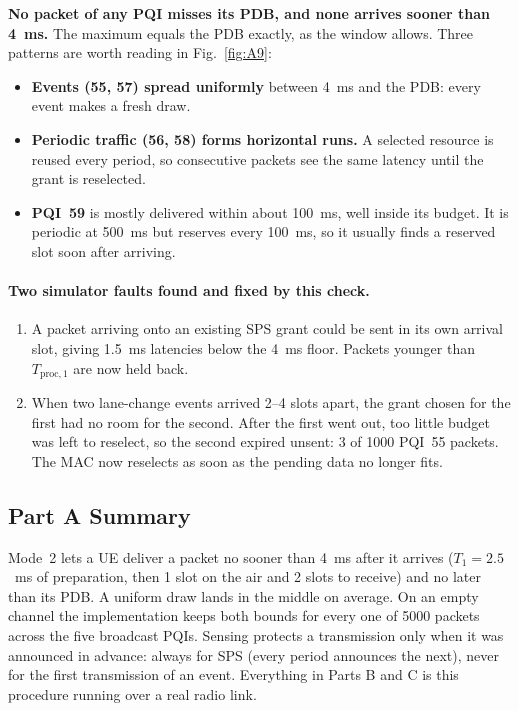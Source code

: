 \documentclass{article}
\newcommand{\Tone}{T_1}
\newcommand{\Tproc}{T_{\mathrm{proc},1}}
\begin{document}
\textbf{No packet of any PQI misses its PDB, and none arrives sooner than
4~ms.} The maximum equals the PDB exactly, as the window allows. Three
patterns are worth reading in Fig.~\ref{fig:A9}:
\begin{itemize}[nosep]
  \item \textbf{Events (55, 57) spread uniformly} between 4~ms and the
  PDB: every event makes a fresh draw.
  \item \textbf{Periodic traffic (56, 58) forms horizontal runs.} A
  selected resource is reused every period, so consecutive packets see
  the same latency until the grant is reselected.
  \item \textbf{PQI~59} is mostly delivered within about 100~ms, well
  inside its budget. It is periodic at 500~ms but reserves every 100~ms,
  so it usually finds a reserved slot soon after arriving.
\end{itemize}

\paragraph{Two simulator faults found and fixed by this check.}
\begin{enumerate}[nosep]
  \item A packet arriving onto an existing SPS grant could be sent in
  its own arrival slot, giving 1.5~ms latencies below the 4~ms floor.
  Packets younger than $\Tproc$ are now held back.
  \item When two lane-change events arrived 2--4 slots apart, the grant
  chosen for the first had no room for the second. After the first went
  out, too little budget was left to reselect, so the second expired
  unsent: 3 of 1000 PQI~55 packets. The MAC now reselects as soon as the
  pending data no longer fits.
\end{enumerate}

\subsection{Part A Summary}

Mode~2 lets a UE deliver a packet no sooner than 4~ms after it arrives
($\Tone = 2.5$~ms of preparation, then 1 slot on the air and 2 slots to
receive) and no later than its PDB. A uniform draw lands in the middle on
average. On an empty channel the implementation keeps both bounds for
every one of 5000 packets across the five broadcast PQIs. Sensing
protects a transmission only when it was announced in advance: always
for SPS (every period announces the next), never for the first
transmission of an event. Everything in Parts B and C is this procedure
running over a real radio link.
\end{document}
